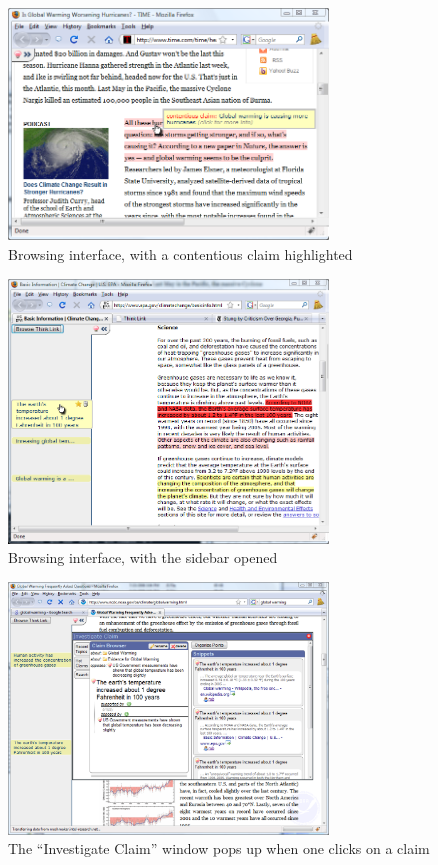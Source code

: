 \documentclass{chi2009}
\begin{document}
\begin{figure}[ht]
	\includegraphics[width=8.5cm]{../screenshots/redhighlight.png}
	\caption{Browsing interface, with a contentious claim highlighted}
	\label{redhighlight}
\end{figure}

\begin{figure}[ht]
	\includegraphics[width=8.5cm]{../screenshots/sidebar.png}
	\caption{Browsing interface, with the sidebar opened}
	\label{sidebar}
\end{figure}

\begin{figure}[ht]
	\includegraphics[width=8.5cm]{../screenshots/claim_popup.png}
	\caption{The ``Investigate Claim'' window pops up when one clicks on a claim}
	\label{redhighlight}
\end{figure}
\end{document}
